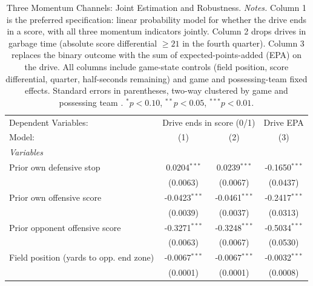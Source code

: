 
\begin{table}[htbp]
   \caption{\label{tab:allchan} Three Momentum Channels: Joint Estimation and Robustness. \textit{Notes.} Column 1 is the preferred specification: linear probability model for whether the drive ends in a score, with all three momentum indicators jointly. Column 2 drops drives in garbage time (absolute score differential $\geq 21$ in the fourth quarter). Column 3 replaces the binary outcome with the sum of expected-points-added (EPA) on the drive. All columns include game-state controls (field position, score differential, quarter, half-seconds remaining) and game and possessing-team fixed effects. Standard errors in parentheses, two-way clustered by game and possessing team \citep{cameron2011robust}. $^{*}p<0.10$, $^{**}p<0.05$, $^{***}p<0.01$.}
   \centering
   \begin{tabular}{lccc}
      \tabularnewline \midrule \midrule
      Dependent Variables: & \multicolumn{2}{c}{Drive ends in score (0/1)} & Drive EPA\\
      Model:                                  & (1)                            & (2)                            & (3)\\  
      \midrule
      \emph{Variables}\\
      Prior own defensive stop                & 0.0204$^{***}$                 & 0.0239$^{***}$                 & -0.1650$^{***}$\\   
                                              & (0.0063)                       & (0.0067)                       & (0.0437)\\   
      Prior own offensive score               & -0.0423$^{***}$                & -0.0461$^{***}$                & -0.2417$^{***}$\\   
                                              & (0.0039)                       & (0.0037)                       & (0.0313)\\   
      Prior opponent offensive score          & -0.3271$^{***}$                & -0.3248$^{***}$                & -0.5034$^{***}$\\   
                                              & (0.0063)                       & (0.0067)                       & (0.0530)\\   
      Field position (yards to opp. end zone) & -0.0067$^{***}$                & -0.0067$^{***}$                & -0.0032$^{***}$\\   
                                              & (0.0001)                       & (0.0001)                       & (0.0008)\\   

\end{tabular}
\end{table}

